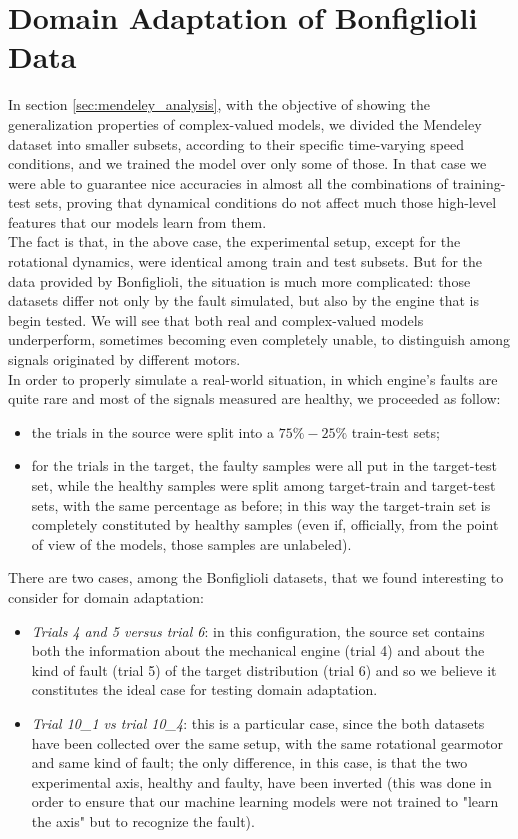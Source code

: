 \documentclass[../main.tex]{subfiles}
\begin{document}
\section{Domain Adaptation of Bonfiglioli Data}

In section \ref{sec:mendeley_analysis}, with the objective of showing the generalization properties of complex-valued models, we divided the Mendeley dataset into smaller subsets, according to their specific time-varying speed conditions, and we trained the model over only  some of those. In that case we were able to guarantee nice accuracies in almost all the combinations of training-test sets, proving that dynamical conditions do not affect much those high-level features that our models learn from them.\\
The fact is that, in the above case, the experimental setup, except for the rotational dynamics, were identical among train and test subsets. But for the data provided by Bonfiglioli, the situation is much more complicated: those datasets differ not only by the fault simulated, but also by the engine that is begin tested. We will see that both real and complex-valued models underperform, sometimes becoming even completely unable, to distinguish among signals originated by different motors.\\
In order to properly simulate a real-world situation, in which engine's faults are quite rare and most of the signals measured are healthy, we proceeded as follow:
\begin{itemize}
	\item the trials in the source were split into a $75\%-25\%$ train-test sets;
	\item for the trials in the target, the faulty samples were all put in the target-test set, while the healthy samples were split among target-train and target-test sets, with the same percentage as before; in this way the target-train set is completely constituted by healthy samples (even if, officially, from the point of view of the models, those samples are unlabeled). 
\end{itemize}
There are two cases, among the Bonfiglioli datasets, that we found interesting to consider for domain adaptation:
\begin{itemize}
	\item \textit{Trials 4 and 5 versus trial 6}: in this configuration, the source set contains both the information about the mechanical engine (trial 4) and about the kind of fault (trial 5) of the target distribution (trial 6) and so we believe it constitutes the ideal case for testing domain adaptation.
	\item \textit{Trial 10\_1 vs trial 10\_4}: this is a particular case, since the both datasets have been collected over the same setup, with the same rotational gearmotor and same kind of fault; the only difference, in this case, is that the two experimental axis, healthy and faulty, have been inverted (this was done in order to ensure that our machine learning models were not trained to "learn the axis" but to recognize the fault).
\end{itemize}
\end{document}
